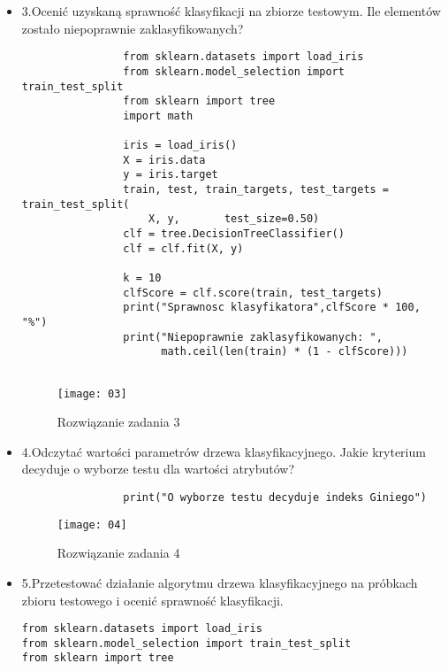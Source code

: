 \documentclass[12pt,a4paper]{article}
\begin{document}
\begin{itemize}
                \item 3.Ocenić uzyskaną sprawność klasyfikacji na zbiorze testowym. Ile elementów zostało niepoprawnie zaklasyfikowanych?
	\begin{lstlisting}
                from sklearn.datasets import load_iris
                from sklearn.model_selection import train_test_split
                from sklearn import tree
                import math
                
                iris = load_iris()
                X = iris.data
                y = iris.target
                train, test, train_targets, test_targets = train_test_split(
                    X, y,       test_size=0.50)
                clf = tree.DecisionTreeClassifier()
                clf = clf.fit(X, y)
                
                k = 10
                clfScore = clf.score(train, test_targets)
                print("Sprawnosc klasyfikatora",clfScore * 100, "%")
                print("Niepoprawnie zaklasyfikowanych: ",
                      math.ceil(len(train) * (1 - clfScore)))
                
	\end{lstlisting}
		\begin{figure}[h]
                        \texttt{[image: 03]}
                        \centering
			\caption{Rozwiązanie zadania 3}
			\label{fig:fig3}
                \end{figure}
                \clearpage

                \item 4.Odczytać wartości parametrów drzewa klasyfikacyjnego. Jakie kryterium decyduje o wyborze testu dla wartości atrybutów?
        \begin{lstlisting}
                print("O wyborze testu decyduje indeks Giniego")
	\end{lstlisting}
		\begin{figure}[h]
                        \texttt{[image: 04]}
                        \centering
			\caption{Rozwiązanie zadania 4}
			\label{fig:fig4}
                \end{figure}
                \clearpage

        \item 5.Przetestować działanie algorytmu drzewa klasyfikacyjnego na próbkach zbioru testowego i ocenić sprawność klasyfikacji.
        	\begin{lstlisting}
from sklearn.datasets import load_iris
from sklearn.model_selection import train_test_split
from sklearn import tree



\end{lstlisting}
\end{itemize}
\end{document}
